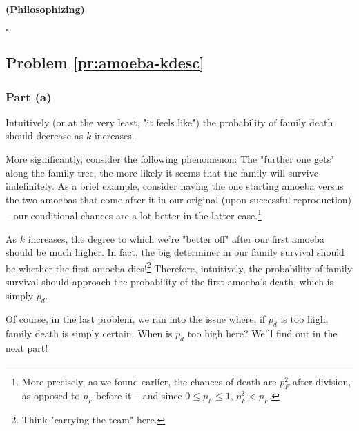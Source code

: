 \paragraph{(Philosophizing)}





$\square$


\subsection{Problem \ref{pr:amoeba-kdesc}}

\subsubsection{Part (a)}

Intuitively (or at the very least, "it feels like") the probability of family death should decrease as $k$ increases.

More significantly, consider the following phenomenon: The "further one gets" along the family tree, the more likely it seems that the family will survive indefinitely. As a brief example, consider having the one starting amoeba versus the two amoebas that come after it in our original (upon successful reproduction) -- our conditional chances are a lot better in the latter case.\footnote{More precisely, as we found earlier, the chances of death are $p_F^2$ after division, as opposed to $p_F$ before it -- and since $0 \leq p_F \leq 1$, $p_F^2 < p_F$.}

As $k$ increases, the degree to which we're "better off" after our first amoeba should be much higher. In fact, the big determiner in our family survival should be whether the first amoeba dies!\footnote{Think "carrying the team" here.} Therefore, intuitively, the probability of family survival should approach the probability of the first amoeba's death, which is simply $p_d$. 

Of course, in the last problem, we ran into the issue where, if $p_d$ is too high, family death is simply certain. When is $p_d$ too high here? We'll find out in the next part!

